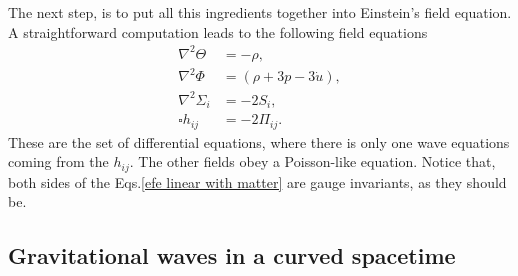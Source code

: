 \documentclass{article}
\begin{document}
The next step, is to put all this ingredients together into Einstein's field equation. A 
straightforward computation leads to the following field equations
\begin{align}
    \label{efe linear with matter}
    \nabla^2 \Theta & = -\rho, \\
    \nabla^2 \Phi & = \left(\rho + 3p - 3\dot{u}\right), \\
    \nabla^2 \Sigma_{i} & = - 2S_{i}, \\
    \square h_{ij} & = -2\Pi_{ij}.
\end{align}
These are the set of differential equations, where there is only one wave equations coming
from the $h_{ij}$. The other fields obey a Poisson-like equation. Notice that, both sides of 
the Eqs.\eqref{efe linear with matter} are gauge invariants, as they should be.

\subsection{Gravitational waves in a curved spacetime}
\end{document}
